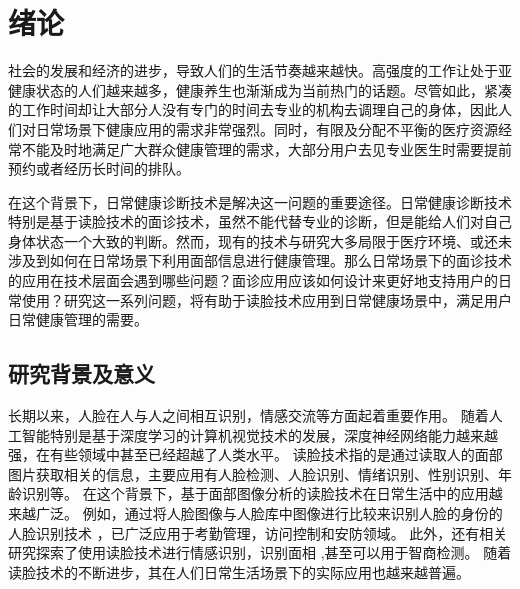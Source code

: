 \chapter{绪论}

社会的发展和经济的进步，导致人们的生活节奏越来越快。高强度的工作让处于亚健康状态的人们越来越多，健康养生也渐渐成为当前热门的话题。尽管如此，紧凑的工作时间却让大部分人没有专门的时间去专业的机构去调理自己的身体，因此人们对日常场景下健康应用的需求非常强烈。同时，有限及分配不平衡的医疗资源经常不能及时地满足广大群众健康管理的需求，大部分用户去见专业医生时需要提前预约或者经历长时间的排队。

在这个背景下，日常健康诊断技术是解决这一问题的重要途径。日常健康诊断技术特别是基于读脸技术的面诊技术，虽然不能代替专业的诊断，但是能给人们对自己身体状态一个大致的判断。然而，现有的技术与研究大多局限于医疗环境、或还未涉及到如何在日常场景下利用面部信息进行健康管理。那么日常场景下的面诊技术的应用在技术层面会遇到哪些问题？面诊应用应该如何设计来更好地支持用户的日常使用？研究这一系列问题，将有助于读脸技术应用到日常健康场景中，满足用户日常健康管理的需要。



\section{研究背景及意义}

长期以来，人脸在人与人之间相互识别，情感交流等方面起着重要作用。
随着人工智能特别是基于深度学习的计算机视觉技术的发展，深度神经网络能力越来越强，在有些领域中甚至已经超越了人类水平\cite{he2015delving}。
读脸技术指的是通过读取人的面部图片获取相关的信息，主要应用有人脸检测、人脸识别、情绪识别、性别识别、年龄识别等。
在这个背景下，基于面部图像分析的读脸技术在日常生活中的应用越来越广泛。
例如，通过将人脸图像与人脸库中图像进行比较来识别人脸的身份的人脸识别技术 \cite{Zhang2016Joint, Schroff2015FaceNet}，已广泛应用于考勤管理\cite{surekha2017attendance}，访问控制\cite{atick2000continuous}和安防领域\cite{liu2005ibotguard}。
此外，还有相关研究探索了使用读脸技术进行情感识别\cite{corneanu2016survey}，识别面相 \cite{Li2007Online, Tempark2012Chinese},甚至可以用于智商检测\cite{Kleisner2014Perceived}。
随着读脸技术的不断进步，其在人们日常生活场景下的实际应用也越来越普遍。

